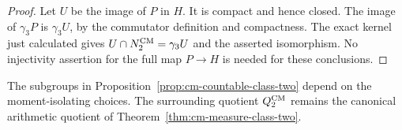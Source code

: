 \begin{proof}
Let \(U\) be the image of \(P\) in \(H\).  It is compact
and hence closed.  The image of \(\gamma_3P\) is
\(\gamma_3U\), by the commutator definition and
compactness.  The exact kernel just calculated gives
\(U\cap N_2^{\rm CM}=\gamma_3U\) and the asserted
isomorphism.  No injectivity assertion for the full
map \(P\to H\) is needed for these conclusions.
\end{proof}

The subgroups in Proposition~\ref{prop:cm-countable-class-two}
depend on the moment-isolating choices.  The surrounding
quotient \(Q_2^{\rm CM}\) remains the canonical arithmetic
quotient of Theorem~\ref{thm:cm-measure-class-two}.

